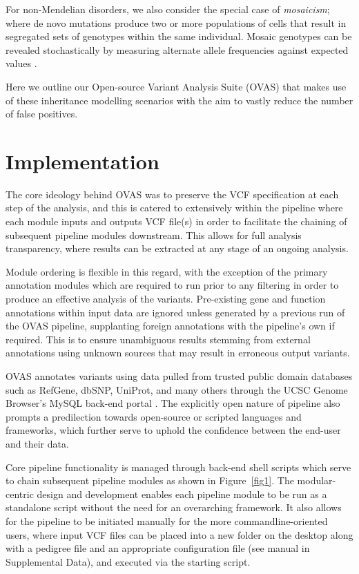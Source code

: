 \documentclass[twocolumn]{bmcart}%
\def\app{OVAS}
\newcommand{\changes}[1]{{\color{red} #1}}
\begin{document}
For non-Mendelian disorders, we also consider the special case of \textit{mosaicism}; where de novo mutations produce two or more populations of cells that result in segregated sets of genotypes within the same individual. Mosaic genotypes can be revealed stochastically by measuring alternate allele frequencies against expected values \cite{biesecker2013genomic}.

Here we outline our Open-source Variant Analysis Suite (\app{}) that makes use of these inheritance modelling scenarios with the aim to vastly reduce the number of false positives.

\section*{Implementation}
The core ideology behind \app{} was to preserve the VCF specification at each step of the analysis, and this is catered to extensively within the pipeline where each module inputs and outputs VCF file(s) in order to facilitate the chaining of subsequent pipeline modules downstream. This allows for full analysis transparency, where results can be extracted at any stage of an ongoing analysis.

Module ordering is flexible in this regard, with the exception of the primary annotation modules which are required to run prior to any filtering in order to produce an effective analysis of the variants. Pre-existing gene and function annotations within input data are ignored unless generated by a previous run of the \app{} pipeline, supplanting foreign annotations with the pipeline's own if required. This is to ensure unambiguous results stemming from external annotations using unknown sources that may result in erroneous output variants.

\changes{\app{} annotates variants using data pulled from trusted public domain databases such as RefGene, dbSNP, UniProt, and many others through the UCSC Genome Browser's MySQL back-end portal \cite{karolchik2003ucsc}}. The explicitly open nature of pipeline also prompts a predilection towards open-source or scripted languages and frameworks, which further serve to uphold the confidence between the end-user and their data.

\changes{Core pipeline functionality is managed through back-end shell scripts which serve to chain subsequent pipeline modules as shown in Figure~\ref{fig1}. The modular-centric design and development enables each pipeline module to be run as a standalone script without the need for an overarching framework. It also allows for the pipeline to be initiated manually for the more commandline-oriented users, where input VCF files can be placed into a new folder on the desktop along with a pedigree file and an appropriate configuration file (see manual in Supplemental Data), and executed via the starting script.} 
\end{document}
